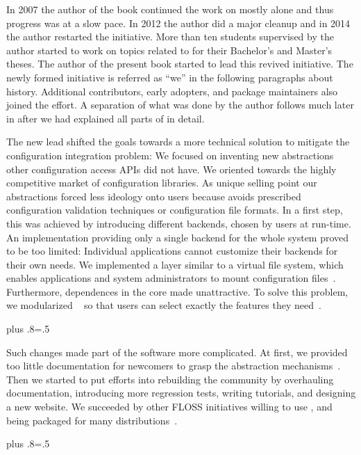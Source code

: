 In 2007 the author of the book continued the work on \elektra{} mostly alone and thus progress was at a slow pace.
In 2012 the author did a major cleanup and in 2014 the author restarted the initiative.
More than ten students supervised by the author started to work on topics related to \elektra{} for their Bachelor's and Master's theses.
The author of the present book started to lead this revived \elektra{} initiative.
The newly formed initiative is referred as ``we'' in the following paragraphs about history.
Additional contributors, early adopters, and package maintainers also joined the effort.
A separation of what was done by the author follows much later in  after we had explained all parts of \elektra{} in detail.

The new lead shifted the goals towards a more technical solution to mitigate the configuration integration problem:
We focused on inventing new abstractions other configuration access APIs did not have.
We oriented towards the highly competitive market of configuration libraries.
As unique selling point our abstractions forced less ideology onto users because \elektra{} avoids prescribed configuration validation techniques or configuration file formats.
In a first step, this was achieved by introducing different backends, chosen by users at run-time.
An implementation providing only a single backend for the whole system proved to be too limited:
Individual applications cannot customize their backends for their own needs.
We implemented a layer similar to a virtual file system, which enables applications and system administrators to mount configuration files~\cite{raab2008thesis}.
Furthermore, dependences in the core made \elektra{} unattractive.
To solve this problem, we modularized \elektra{}~\cite{raab2010thesis} so that users can select exactly the features they need~\cite{raab2017challenges}.%
{\parfillskip=0pt plus .8\textwidth \emergencystretch=.5\textwidth \par}

Such changes made part of the software more complicated.
At first, we provided too little documentation for newcomers to grasp the abstraction mechanisms~\cite{raab2010thesis}.
Then we started to put efforts into rebuilding the community by overhauling documentation, introducing more regression tests, writing tutorials, and designing a new website.
We succeeded by other FLOSS initiatives willing to use \elektra{}, and \elektra{} being packaged for many distributions~\cite{raab2017challenges}.%
{\parfillskip=0pt plus .8\textwidth \emergencystretch=.5\textwidth \par}


